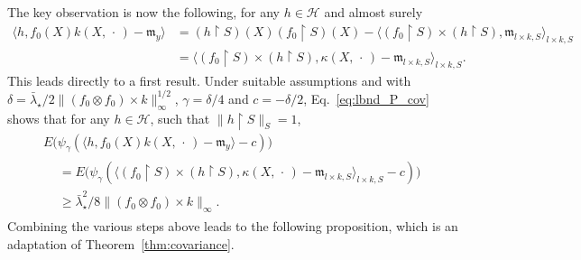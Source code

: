 \documentclass[AHL,Unicode,longabstracts,published]{cedram}
\theoremstyle{remark}
\newcommand{\restr}
{\!\!\upharpoonright\!}
\newcommand{\cH}{\mathcal{H}}
\newcommand{\mean}{\mathfrak{m}}
\newcounter{setofstep}
\newcounter{step}[setofstep]
\begin{document}
The key observation is now the following, for any $h \in \cH$ and almost surely
\begin{align*}
\bigl\langle h, f_0(X) k(X,\,\cdot\,) - \mean_y \bigr\rangle &= (h \restr S)(X) (f_0 \restr S)(X) - \bigl\langle (f_0 \restr S)\times (h\restr S), \mean_{l\times k,S} \bigr\rangle_{l\times k, S} \\
&= \bigl\langle (f_0 \restr S) \times (h \restr S), \kappa(X,\,\cdot\,) - \mean_{l\times k,S} \bigr\rangle_{l\times k, S}.
\end{align*}
This leads directly to a first result. Under suitable assumptions and with $\delta = \bar \lambda_\star/2 \|(f_0 \otimes f_0) \times k\|_\infty^{1/2}$, $\gamma = \delta/4$ and $c = - \delta/2$, Eq.~\eqref{eq:lbnd_P_cov} shows that for any $h\in \cH$, such that $\|h\restr S\|_S=1$,
\begin{multline}
\label{eq:paley_zygmund_f_0}
E\bigl(\psi_\gamma(\langle h,f_0(X)k(X,\,\cdot\,) - \mean_y \rangle -c)\bigr)  \\
\begin{aligned}
&= E\bigl(\psi_\gamma(\langle (f_0 \restr S) \times (h \restr S), \kappa(X,\,\cdot\,) - \mean_{l\times k,S} \rangle_{l\times k, S} - c)\bigr)  \\
&\geq \bar \lambda_\star^2/8\|(f_0 \otimes f_0) \times k\|_\infty.
\end{aligned}
\end{multline}
Combining the various steps above leads to the following proposition, which is an adaptation of Theorem~\ref{thm:covariance}.
\end{document}
